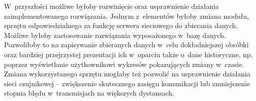 W~przyszłości możliwe byłoby rozwinięcie oraz usprawnienie działania zaimplementowanego rozwiązania. Jednym z~elementów
byłoby zmiana modułu, sprzętu odpowiedzialnego za funkcję serwera sieciowego do zbierania danych. Możliwe byłoby
zastosowanie rozwiązania wyposażonego w~bazę danych. Pozwoliłoby to na zapisywanie zbieranych danych w~celu
dokładniejszej obróbki oraz bardziej przejrzystej prezentacji ich w~oparciu także o~dane historyczne, np. poprzez
wyświetlanie użytkownikowi wykresów pokazujących zmiany w~czasie. Zmiana wykorzystanego sprzętu mogłaby też pozwolić na
usprawnienie działania sieci czujnikowej -- zwiększenie skutecznego zasięgu komunikacji lub zmniejszenie stopnia błędu
w~transmisjach na większych dystansach.